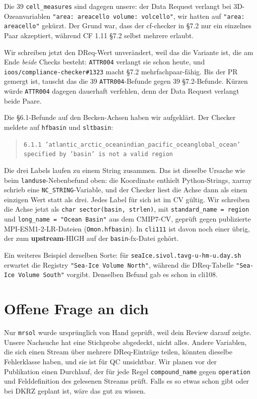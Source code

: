 \documentclass[11pt,a4paper]{article}
\newcommand{\code}[1]{\texttt{\small #1}}
\newcommand{\upstream}{\textcolor{blue!60!black}{\textbf{upstream}}}
\begin{document}
Die 39 \code{cell\_measures} sind dagegen unsere: der Data Request verlangt bei
3D-Ozeanvariablen \code{"area: areacello volume: volcello"}, wir hatten auf
\code{"area: areacello"} gek\"urzt. Der Grund war, dass der cf-checker in \S7.2 nur
ein einzelnes Paar akzeptiert, w\"ahrend CF 1.11 \S7.2 selbst mehrere erlaubt.

Wir schreiben jetzt den DReq-Wert unver\"andert, weil das die Variante ist, die
am Ende \emph{beide} Checks besteht: \code{ATTR004} verlangt sie schon heute, und
\code{ioos/compliance-checker\#1323} macht \S7.2 mehrfachpaar-f\"ahig. Bis der PR
gemergt ist, tauscht das die 39 \code{ATTR004}-Befunde gegen 39 \S7.2-Befunde.
K\"urzen w\"urde \code{ATTR004} dagegen dauerhaft verfehlen, denn der Data Request
verlangt beide Paare.

Die \S6.1-Befunde auf den Becken-Achsen haben wir aufgekl\"art. Der Checker
meldete auf \code{hfbasin} und \code{sltbasin}:

\begin{quote}
\code{6.1.1 'atlantic\_arctic\_oceanindian\_pacific\_oceanglobal\_ocean'
specified by 'basin' is not a valid region}
\end{quote}

Die drei Labels laufen zu einem String zusammen. Das ist dieselbe Ursache wie
beim \code{landuse}-Nebenbefund oben: die Koordinate enthielt Python-Strings,
xarray schrieb eine \code{NC\_STRING}-Variable, und der Checker liest die Achse
dann als einen einzigen Wert statt als drei. Jedes Label f\"ur sich ist im CV
g\"ultig. Wir schreiben die Achse jetzt als \code{char sector(basin, strlen)},
mit \code{standard\_name = region} und \code{long\_name = "Ocean Basin"} aus dem
CMIP7-CV, gepr\"uft gegen publizierte MPI-ESM1-2-LR-Dateien (\code{Omon.hfbasin}).
In \code{cli111} ist davon noch einer \"ubrig, der zum
\upstream-HIGH auf der \code{basin}-fx-Datei geh\"ort.

Ein weiteres Beispiel derselben Sorte: f\"ur
\code{seaIce.sivol.tavg-u-hm-u.day.sh} erwartet die Registry
\code{"Sea-Ice Volume North"}, w\"ahrend die DReq-Tabelle
\code{"Sea-Ice Volume South"} vorgibt. Denselben Befund gab es schon in cli108.

\section{Offene Frage an dich}

Nur \code{mrsol} wurde urspr\"unglich von Hand gepr\"uft, weil dein Review darauf
zeigte. Unsere Nachsuche hat eine Stichprobe abgedeckt, nicht alles. Andere
Variablen, die sich einen Stream \"uber mehrere DReq-Eintr\"age teilen, k\"onnten
dieselbe Fehlerklasse haben, und sie ist f\"ur QC unsichtbar. Wir planen vor der
Publikation einen Durchlauf, der f\"ur jede Regel \code{compound\_name} gegen
\code{operation} und Felddefinition des gelesenen Streams pr\"uft. Falls es so etwas
schon gibt oder bei DKRZ geplant ist, w\"are das gut zu wissen.
\end{document}
